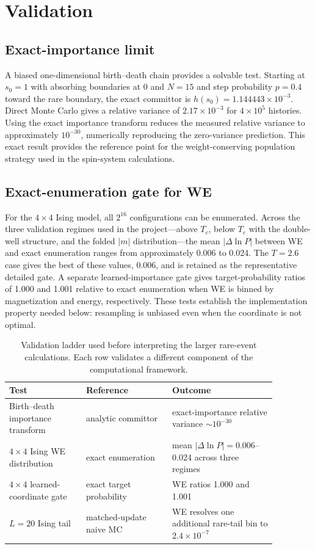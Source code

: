 \documentclass[a4paper,fleqn]{cas-sc}
\begin{document}
\section{Validation}
\subsection{Exact-importance limit}
A biased one-dimensional birth--death chain provides a solvable test. Starting at $s_0=1$ with absorbing boundaries at $0$ and $N=15$ and step probability $p=0.4$ toward the rare boundary, the exact committor is $h(s_0)=1.144443\times10^{-3}$. Direct Monte Carlo gives a relative variance of $2.17\times10^{-3}$ for $4\times10^5$ histories. Using the exact importance transform reduces the measured relative variance to approximately $10^{-30}$, numerically reproducing the zero-variance prediction. This exact result provides the reference point for the weight-conserving population strategy used in the spin-system calculations.

\subsection{Exact-enumeration gate for WE}
For the $4\times4$ Ising model, all $2^{16}$ configurations can be enumerated. Across the three validation regimes used in the project---above $T_c$, below $T_c$ with the double-well structure, and the folded $|m|$ distribution---the mean $|\Delta\ln P|$ between WE and exact enumeration ranges from approximately 0.006 to 0.024. The $T=2.6$ case gives the best of these values, 0.006, and is retained as the representative detailed gate. A separate learned-importance gate gives target-probability ratios of 1.000 and 1.001 relative to exact enumeration when WE is binned by magnetization and energy, respectively. These tests establish the implementation property needed below: resampling is unbiased even when the coordinate is not optimal.

\begin{table}[H]
\centering
\caption{Validation ladder used before interpreting the larger rare-event calculations. Each row validates a different component of the computational framework.}
\label{tab:validation}
\begin{tabular}{p{0.25\linewidth}p{0.28\linewidth}p{0.34\linewidth}}
\toprule
Test & Reference & Outcome \\
\midrule
Birth--death importance transform & analytic committor & exact-importance relative variance $\sim10^{-30}$ \\
$4\times4$ Ising WE distribution & exact enumeration & mean $|\Delta\ln P|=0.006$--0.024 across three regimes \\
$4\times4$ learned-coordinate gate & exact target probability & WE ratios 1.000 and 1.001 \\
$L=20$ Ising tail & matched-update naive MC & WE resolves one additional rare-tail bin to $2.4\times10^{-7}$ \\
\bottomrule
\end{tabular}
\end{table}
\end{document}
